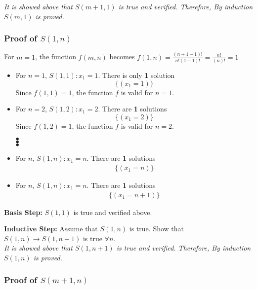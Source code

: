 \documentclass[11pt]{article}
\begin{document}
\textit{It is showed above that $S(m+1, 1)$ is true and verified. Therefore, By induction $S(m, 1)$ is proved.}


\subsubsection*{Proof of $S(1, n)$}

For $m = 1$, the function $f(m, n)$ becomes $f(1, n) = \frac{(n + 1 - 1)!}{n! (1-1)!} = \frac{n!}{(n)!} = 1$

\begin{itemize}
    \item For $n = 1$, $S(1, 1): x_1 = 1$. There is only \textbf{1} solution
    \begin{equation*}
        \{(x_1 = 1)\}
    \end{equation*}
    Since $f(1, 1) = 1$, the function $f$ is valid for $n = 1$.
    \item For $n = 2$, $S(1, 2): x_1 = 2$. There are \textbf{1} solutions
    \begin{equation*}
        \{(x_1 = 2)\}
    \end{equation*}
    Since $f(1, 2) = 1$, the function $f$ is valid for $n = 2$.
    \begin{center}
        $\bullet$\\
        $\bullet$\\
        $\bullet$\\    
    \end{center}
    \item For $n$, $S(1, n): x_1 = n$. There are \textbf{1} solutions
    \begin{align*}
        \{(x_1 = n)\}
    \end{align*}
    \item For $n$, $S(1, n): x_1 = n$. There are \textbf{1} solutions
    \begin{align*}
        \{(x_1 = n+1)\}
    \end{align*}
\end{itemize}

\textbf{Basis Step:} $S(1, 1)$ is true and verified above.

\textbf{Inductive Step:} Assume that $S(1, n)$ is true. Show that $S(1, n) \rightarrow S(1, n+1)$ is true $\forall n$.\\ 

\textit{It is showed above that $S(1, n+1)$ is true and verified. Therefore, By induction $S(1, n)$ is proved.}


\subsubsection*{Proof of $S(m+1, n)$}
\end{document}
